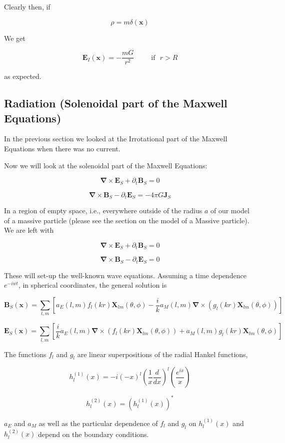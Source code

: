 \documentclass {article}
\renewcommand\vec{\mathbf}
\let\OldS\nabla
\renewcommand{\nabla}{\boldsymbol{\OldS}}
\begin{document}
Clearly then, if

$$\rho = m\delta(\vec x) $$

We get

$$\vec E_I(\vec x) = - \frac {mG} {r^2}  ~~~~~~~~~~~ \textrm{if} ~~~ r > R$$

as expected.
\newpage
\subsection{Radiation (Solenoidal part of the Maxwell Equations)}

In the previous section we looked at the Irrotational part of the Maxwell Equations when there was no current.

Now we will look at the solenoidal part of the Maxwell Equations:

$$\nabla \times \vec E_S + \partial_t \vec B_S = 0 $$

$$\nabla \times \vec B_S - \partial_t \vec E_S =  - 4 \pi G \vec J_S$$

In a region of empty space, i.e., everywhere outside of the radius $a$ of our model of a massive particle (please see the section on the model of a Massive particle). We are left with 

$$\nabla \times \vec E_S + \partial_t \vec B_S = 0 $$

$$\nabla \times \vec B_S - \partial_t \vec E_S =  0$$

These will set-up the well-known wave equations. Assuming a time dependence $e^{-iwt}$, in spherical coordinates, the general solution is

$$\vec B_S (\vec x) = \sum_{l, m} \left[ a_E(l,m)f_l(kr) \vec X_{lm}(\theta , \phi) - \frac i k a_M (l, m) \nabla \times \left(  g_l (kr) \vec X_{lm} (\theta , \phi) \right) \right]$$

$$ \vec E_S (\vec x) = \sum_{l, m} \left[ \frac i k a_E(l,m) \nabla \times  \left( f_l (kr) \vec X_{lm}(\theta, \phi)\right) + a_M(l,m) g_l (kr) \vec X_{lm}(\theta, \phi) \right]$$

The functions $f_l$ and $g_l$ are linear superpositions of the radial Hankel functions,

$$h_l^{(1)}(x) = -i (-x)^l \left(\frac 1 x \frac d {dx} \right)^l \left(\frac {e^{ix}} x \right)$$

$$h_l^{(2)}(x) = \left( h_l^{(1)}(x) \right)^*$$

\noindent $a_E$ and $a_M$ as well as the particular dependence of $f_l$ and $g_l$ on $h_l^{(1)}(x) $ and $h_l^{(2)}(x) $ depend on the boundary conditions.
\end{document}
